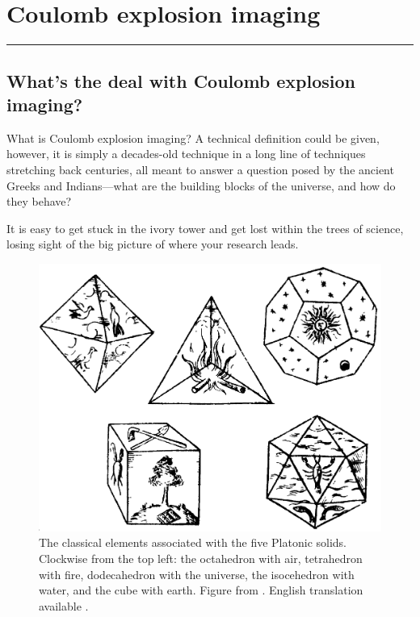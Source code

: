 \chapter{Coulomb explosion imaging}\label{ch:CEI}

\vspace{-1.5 em}
\begin{addmargin}[-0.5cm]{0cm}
  \minitoc
\end{addmargin}
\hrule
\vspace{1.5 em}

\section{What's the deal with Coulomb explosion imaging?}
What is Coulomb explosion imaging? A technical definition could be given, however, it is simply a decades-old technique in a long line of techniques stretching back centuries, all meant to answer a question posed by the ancient Greeks and Indians---what are the building blocks of the universe, and how do they behave?

It is easy to get stuck in the ivory tower and get lost within the trees of science, losing sight of the big picture of where your research leads.

\pagebreak
\begin{figure}
  \centering
  \includegraphics[width=\textwidth]{gfx/PlatonicSolids}
  \caption[The classical elements associated with the five Platonic solids.]
  {The classical elements associated with the five Platonic solids. Clockwise from the top left: the octahedron with air, tetrahedron with fire, dodecahedron with the universe, the isocehedron with water, and the cube with earth. Figure from \citet[Book 2, p. 53]{Kepler1619}. English translation available \citep{Kepler97}.}
  \label{fig:platonicSolids}
\end{figure}
\clearpage

